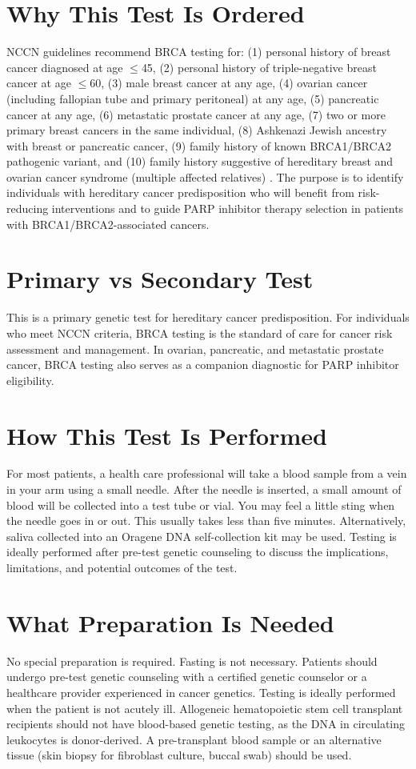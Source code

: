 \section*{Why This Test Is Ordered}
NCCN guidelines recommend BRCA testing for: (1) personal history of breast cancer diagnosed at age $\leq$45, (2) personal history of triple-negative breast cancer at age $\leq$60, (3) male breast cancer at any age, (4) ovarian cancer (including fallopian tube and primary peritoneal) at any age, (5) pancreatic cancer at any age, (6) metastatic prostate cancer at any age, (7) two or more primary breast cancers in the same individual, (8) Ashkenazi Jewish ancestry with breast or pancreatic cancer, (9) family history of known BRCA1/BRCA2 pathogenic variant, and (10) family history suggestive of hereditary breast and ovarian cancer syndrome (multiple affected relatives) \cite{nccn2024genetic}. The purpose is to identify individuals with hereditary cancer predisposition who will benefit from risk-reducing interventions and to guide PARP inhibitor therapy selection in patients with BRCA1/BRCA2-associated cancers.

\section*{Primary vs Secondary Test}
This is a primary genetic test for hereditary cancer predisposition. For individuals who meet NCCN criteria, BRCA testing is the standard of care for cancer risk assessment and management. In ovarian, pancreatic, and metastatic prostate cancer, BRCA testing also serves as a companion diagnostic for PARP inhibitor eligibility.

\section*{How This Test Is Performed}
For most patients, a health care professional will take a blood sample from a vein in your arm using a small needle. After the needle is inserted, a small amount of blood will be collected into a test tube or vial. You may feel a little sting when the needle goes in or out. This usually takes less than five minutes. Alternatively, saliva collected into an Oragene DNA self-collection kit may be used. Testing is ideally performed after pre-test genetic counseling to discuss the implications, limitations, and potential outcomes of the test.

\section*{What Preparation Is Needed}
No special preparation is required. Fasting is not necessary. Patients should undergo pre-test genetic counseling with a certified genetic counselor or a healthcare provider experienced in cancer genetics. Testing is ideally performed when the patient is not acutely ill. Allogeneic hematopoietic stem cell transplant recipients should not have blood-based genetic testing, as the DNA in circulating leukocytes is donor-derived. A pre-transplant blood sample or an alternative tissue (skin biopsy for fibroblast culture, buccal swab) should be used.

